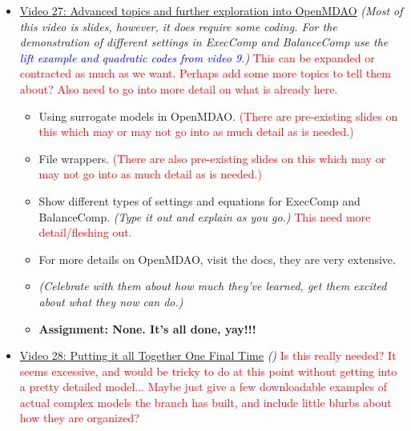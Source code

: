 \documentclass[12pt, letterpaper]{article}
\begin{document}
\begin{itemize}
	\item \underline{Video 27: Advanced topics and further exploration into OpenMDAO} \textit{(Most of this video is slides, however, it does require some coding. For the demonstration of different settings in ExecComp and BalanceComp use the \textcolor{blue}{lift example and quadratic codes from video 9.})} \textcolor{red}{This can be expanded or contracted as much as we want. Perhaps add some more topics to tell them about? Also need to go into more detail on what is already here.}
		\begin{itemize}
			\item Using surrogate models in OpenMDAO. \textcolor{red}{(There are pre-existing slides on this which may or may not go into as much detail as is needed.)}
			\item File wrappers. \textcolor{red}{(There are also pre-existing slides on this which may or may not go into as much detail as is needed.)}
			\item Show different types of settings and equations for ExecComp and BalanceComp. \textit{(Type it out and explain as you go.)} \textcolor{red}{This need more detail/fleshing out.}
			\item For more details on OpenMDAO, visit the docs, they are very extensive.
			\item \textit{(Celebrate with them about how much they’ve learned, get them excited about what they now can do.)}
			\item \textbf{Assignment: None. It's all done, yay!!!}
		\end{itemize}
		
	\item \underline{Video 28: Putting it all Together One Final Time} \textit{()} \textcolor{red}{Is this really needed? It seems excessive, and would be tricky to do at this point without getting into a pretty detailed model... Maybe just give a few downloadable examples of actual complex models the branch has built, and include little blurbs about how they are organized?}
	
\end{itemize}
\end{document}
